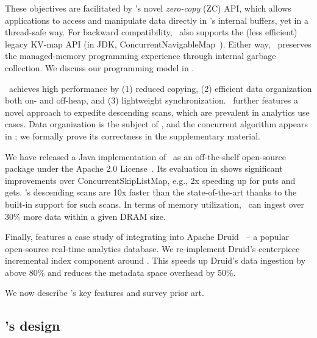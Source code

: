 These objectives are facilitated by \oak's novel \emph{zero-copy} (ZC) API, which 
allows applications to access and manipulate data directly in \oak's internal buffers, yet in a thread-safe way. 
For backward compatibility, \oak\ also supports the (less efficient) legacy KV-map API (in JDK, 
ConcurrentNavigableMap~\cite{JavaConcurrentNavigableMap}).
Either way,
\oak\ preserves the managed-memory programming experience through internal garbage collection.  
We discuss our programming model  in . 

\oak\ achieves high   
performance by (1) reduced copying, (2) efficient data organization both on- and off-heap, 
and (3) lightweight synchronization. \oak\ further features a novel approach to expedite 
descending scans, which are prevalent in analytics use cases. Data organization is the subject of 
, and the concurrent algorithm appears in ; we formally prove its 
correctness in the supplementary material. 

We have released a Java implementation of \oak\  as an off-the-shelf open-source 
package under the Apache 2.0 License~\cite{OakOpenSource}.  
Its evaluation in   shows
 significant improvements over  ConcurrentSkipListMap, e.g.,  2x speeding up for puts and gets. 
\oak's descending scans are 10x faster than the state-of-the-art
thanks to the built-in support for such scans. 
In terms of memory utilization, \oak\ can ingest over 30\% more data within a given DRAM size. 

Finally,  features a case study of integrating \oak\/ into Apache 
Druid~\cite{Druid} -- a popular open-source real-time analytics database.   
We re-implement Druid's centerpiece incremental index component around \oak.
This speeds up Druid's data ingestion by above 80\% and reduces the metadata space overhead by 50\%. 
  
We now describe \oak's key features and survey prior art. 

\vspace{-10pt}
\subsection{\oak's design}


